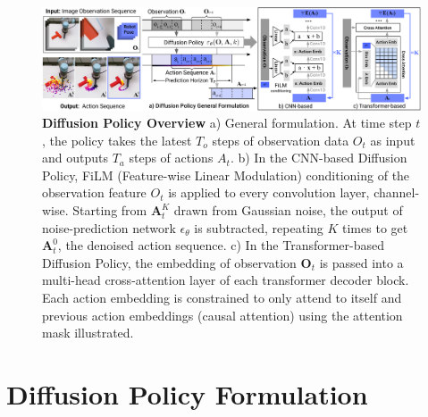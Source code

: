 

\begin{figure}[t]
    \centering
    \includegraphics[width=\linewidth]{figure/policy_input_output.pdf}
    \caption{\textbf{Diffusion Policy Overview} \label{fig:policy_io} a) General formulation. At time step $t$, the policy takes the latest $T_o$ steps of observation data $O_t$ as input and outputs $T_a$ steps of actions $A_t$.  b) In the CNN-based Diffusion Policy, FiLM (Feature-wise Linear Modulation) \cite{perez2018film} conditioning of the observation feature $O_t$ is applied to every convolution layer, channel-wise. Starting from $\mathbf{A}^K_t$ drawn from Gaussian noise, the output of noise-prediction network $\epsilon_\theta$ is subtracted, repeating $K$ times to get $\mathbf{A}^0_t$, the denoised action sequence. c) In the Transformer-based \cite{vaswani2017attention} Diffusion Policy, the embedding of observation $\mathbf{O}_t$ is passed into a multi-head cross-attention layer of each transformer decoder block. Each action embedding is constrained to only attend to itself and previous action embeddings (causal attention) using the attention mask illustrated.  }
\end{figure}

\section{Diffusion Policy Formulation}
\label{sec:method}

